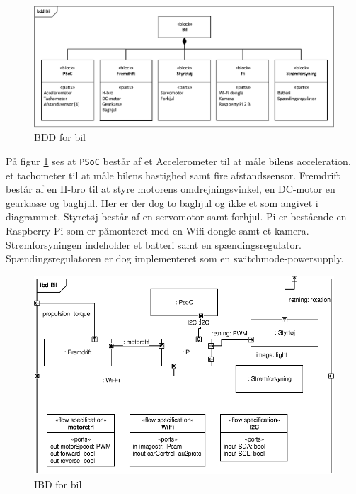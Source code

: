 \begin{figure}[h]
\centering
\includegraphics[width=\textwidth]{../fig/diagrammer/bil/bdd_bil.pdf}
\caption{BDD for bil}
\label{fig:bdd_bil}
\end{figure}

På figur \ref{fig:bdd_bil} ses at \texttt{PSoC} består af et Accelerometer til at måle bilens acceleration, et tachometer til at måle bilens hastighed samt fire afstandssensor. Fremdrift består af en H-bro til at styre motorens omdrejningsvinkel, en DC-motor en gearkasse og baghjul. Her er der dog to baghjul og ikke et som angivet i diagrammet. Styretøj består af en servomotor samt forhjul. Pi er bestående en  Raspberry-Pi som er påmonteret med en Wifi-dongle samt et kamera. Strømforsyningen indeholder et batteri samt en spændingsregulator. Spændingsregulatoren er dog implementeret som en switchmode-powersupply.  

\begin{figure}[h]
\centering
\includegraphics[scale=1]{../fig/diagrammer/bil/ibd_bil.pdf}
\caption{IBD for bil}
\label{fig:ibd_bil}
\end{figure} 

\clearpage
